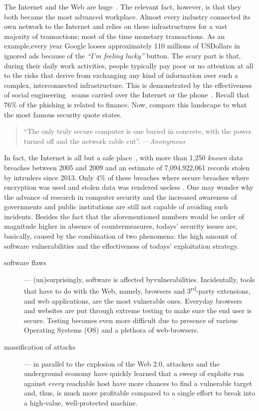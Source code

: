 \documentclass[12pt]{article}
\theoremstyle{definition}
\begin{document}
		The Internet and the Web are huge~\cite{torpig}. The relevant fact, however, is that they both became the most advanced workplace. Almost every industry connected its own network to the Internet and relies on these infrastructures for a vast majority of transactions; most of the time monetary transactions. As an example,every year \textsf{Google} looses approximately 110 millions of USDollars in ignored ads because of the \emph{``I'm feeling lucky''} button. The scary part is that, during their daily work activities, people typically pay poor or no attention at all to the risks that derive from exchanging any kind of information over such a complex, interconnected infrastructure. This is demonstrated by the effectiveness of social engineering~\cite{deception} scams carried over the Internet or the phone~\cite{social-engineering-fundamentals}. Recall that 76\% of the phishing is related to finance. Now, compare this landscape to what the most famous security quote states.
		 
		 \begin{quotation}
		 	``The only truly secure computer is one buried in concrete, with the power turned off and the network cable cut''.
		 	---\emph{Anonymous}
		 \end{quotation}
		
		In fact, the Internet is all but a safe place~\cite{whid}, with more than 1,250 \emph{known} data breaches between 2005 and 2009 \cite{breach-data} and an estimate of 7,094,922,061 records stolen by intruders since 2013. Only 4\% of these breaches where secure breaches where encryption was used and stolen data was rendered useless \cite{breach-data}. One may wonder why the advance of research in computer security and the increased awareness of governments and public institutions are still not capable of avoiding such incidents. Besides the fact that the aforementioned numbers would be order of magnitude higher in absence of countermeasures, todays' security issues are, basically, caused by the combination of two phenomena: the high amount of software vulnerabilities and the effectiveness of todays' exploitation strategy.
		
		
		\begin{description}
			\item[software flaws] --- (un)surprisingly, software is affected byvulnerabilities. Incidentally, tools that have to do with the Web,
			namely, browsers and 3\textsuperscript{rd}-party extensions, and web
			applications, are the most vulnerable ones. Everyday browsers and websites are put through extreme testing to make sure the end user is secure. Testing becomes even more difficult due to presence of various Operating Systems (OS) and a plethora of web-browsers.
			
			\item[massification of attacks] --- in parallel to the explosion of the Web 2.0, attackers and the underground economy have quickly learned that a sweep of exploits run against \emph{every} reachable host have more chances to find a vulnerable target and, thus, is much more profitable compared to a single effort to break into a high-value, well-protected machine.
		\end{description}
		
\end{document}
